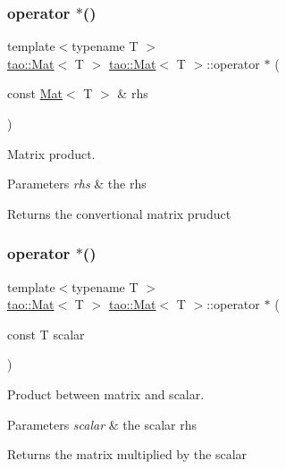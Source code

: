 \subsubsection{\texorpdfstring{operator $\ast$()}{operator *()}\hspace{0.1cm}{\footnotesize\ttfamily [1/2]}}
{\footnotesize\ttfamily template$<$typename T $>$ \\
\mbox{\hyperlink{classtao_1_1_mat}{tao\+::\+Mat}}$<$ T $>$ \mbox{\hyperlink{classtao_1_1_mat}{tao\+::\+Mat}}$<$ T $>$\+::operator $\ast$ (\begin{DoxyParamCaption}\item[{const \mbox{\hyperlink{classtao_1_1_mat}{Mat}}$<$ T $>$ \&}]{rhs }\end{DoxyParamCaption})}



Matrix product. 


\begin{DoxyParams}{Parameters}
{\em rhs} & the rhs \\
\hline
\end{DoxyParams}
\begin{DoxyReturn}{Returns}
the convertional matrix pruduct 
\end{DoxyReturn}
\mbox{\label{classtao_1_1_mat_a83de238ae44b6cf2bcaa342dd514f333}} 
\subsubsection{\texorpdfstring{operator $\ast$()}{operator *()}\hspace{0.1cm}{\footnotesize\ttfamily [2/2]}}
{\footnotesize\ttfamily template$<$typename T $>$ \\
\mbox{\hyperlink{classtao_1_1_mat}{tao\+::\+Mat}}$<$ T $>$ \mbox{\hyperlink{classtao_1_1_mat}{tao\+::\+Mat}}$<$ T $>$\+::operator $\ast$ (\begin{DoxyParamCaption}\item[{const T}]{scalar }\end{DoxyParamCaption})}



Product between matrix and scalar. 


\begin{DoxyParams}{Parameters}
{\em scalar} & the scalar rhs \\
\hline
\end{DoxyParams}
\begin{DoxyReturn}{Returns}
the matrix multiplied by the scalar 
\end{DoxyReturn}
\mbox{\label{classtao_1_1_mat_add01ca6b2275ad6d4fbde98056d73276}} 
